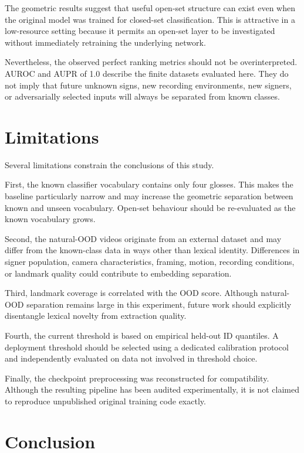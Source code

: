 \documentclass[11pt]{article}
\begin{document}
The geometric results suggest that useful open-set structure
can exist even when the original model was trained for
closed-set classification. This is attractive in a
low-resource setting because it permits an open-set layer to
be investigated without immediately retraining the underlying
network.

Nevertheless, the observed perfect ranking metrics should
not be overinterpreted. AUROC and AUPR of 1.0 describe the
finite datasets evaluated here. They do not imply that future
unknown signs, new recording environments, new signers, or
adversarially selected inputs will always be separated from
known classes.


\section{Limitations}

Several limitations constrain the conclusions of this study.

First, the known classifier vocabulary contains only four
glosses. This makes the baseline particularly narrow and may
increase the geometric separation between known and unseen
vocabulary. Open-set behaviour should be re-evaluated as the
known vocabulary grows.

Second, the natural-OOD videos originate from an external
dataset and may differ from the known-class data in ways
other than lexical identity. Differences in signer population,
camera characteristics, framing, motion, recording conditions,
or landmark quality could contribute to embedding separation.

Third, landmark coverage is correlated with the OOD score.
Although natural-OOD separation remains large in this
experiment, future work should explicitly disentangle lexical
novelty from extraction quality.

Fourth, the current threshold is based on empirical held-out
ID quantiles. A deployment threshold should be selected using
a dedicated calibration protocol and independently evaluated
on data not involved in threshold choice.

Finally, the checkpoint preprocessing was reconstructed for
compatibility. Although the resulting pipeline has been
audited experimentally, it is not claimed to reproduce
unpublished original training code exactly.


\section{Conclusion}
\end{document}
